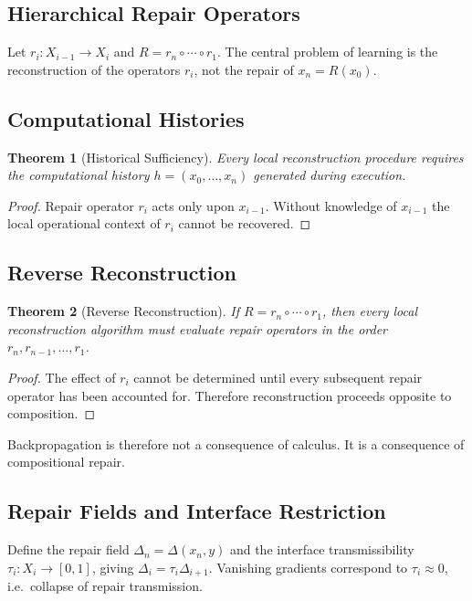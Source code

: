 \documentclass[12pt,oneside]{article}
\theoremstyle{plain}
\newtheorem{theorem}{Theorem}[section]
\theoremstyle{definition}
\theoremstyle{remark}
\theoremstyle{plain}
\begin{document}
\subsection{Hierarchical Repair Operators}

Let $r_i : X_{i-1} \rightarrow X_i$ and $R = r_n \circ \cdots \circ r_1$. The central problem of
learning is the reconstruction of the operators $r_i$, not the repair of $x_n = R(x_0)$.

\subsection{Computational Histories}

\begin{theorem}[Historical Sufficiency]
Every local reconstruction procedure requires the computational history $h = (x_0, \ldots, x_n)$
generated during execution.
\end{theorem}

\begin{proof}
Repair operator $r_i$ acts only upon $x_{i-1}$. Without knowledge of $x_{i-1}$ the local
operational context of $r_i$ cannot be recovered.
\end{proof}

\subsection{Reverse Reconstruction}

\begin{theorem}[Reverse Reconstruction]
If $R = r_n \circ \cdots \circ r_1$, then every local reconstruction algorithm must evaluate
repair operators in the order $r_n, r_{n-1}, \ldots, r_1$.
\end{theorem}

\begin{proof}
The effect of $r_i$ cannot be determined until every subsequent repair operator has been accounted
for. Therefore reconstruction proceeds opposite to composition.
\end{proof}

Backpropagation is therefore not a consequence of calculus. It is a consequence of compositional
repair.

\subsection{Repair Fields and Interface Restriction}

Define the repair field $\Delta_n = \Delta(x_n, y)$ and the interface transmissibility
$\tau_i : X_i \rightarrow [0,1]$, giving $\Delta_i = \tau_i \Delta_{i+1}$. Vanishing gradients
correspond to $\tau_i \approx 0$, i.e.\ collapse of repair transmission.
\end{document}
